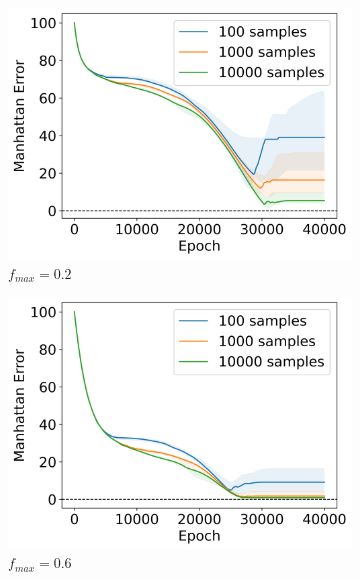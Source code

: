 \documentclass{article}
\theoremstyle{plain}
\theoremstyle{definition}
\theoremstyle{remark}
\begin{document}
\begin{figure}[h]
     \centering
     \begin{subfigure}[b]{0.32\textwidth}
         \centering
         \includegraphics[width=\textwidth]{sgd_k3_50ci_20frac.png}
         \caption{$f_{max}=0.2$}
         \label{fig:appendix_sgd_k=3_0.2frac}
     \end{subfigure}
     \hfill
     \begin{subfigure}[b]{0.32\textwidth}
         \centering
         \includegraphics[width=\textwidth]{sgd_k3_50ci_60frac.png}
         \caption{$f_{max}=0.6$}
         \label{fig:appendix_sgd_k=3_0.6frac}
     \end{subfigure}
     \hfill
     \begin{subfigure}[b]{0.32\textwidth}

\end{subfigure}
\end{figure}
\end{document}
